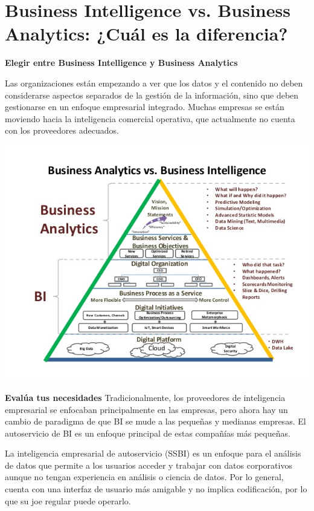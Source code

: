 \section{Business Intelligence vs. Business Analytics: ¿Cuál es la diferencia?} 
\textbf{Elegir entre Business Intelligence y Business Analytics}
\vspace{5mm} %

Las organizaciones están empezando a ver que los datos y el contenido no deben considerarse aspectos separados de la gestión de la información, sino que deben gestionarse en un enfoque empresarial integrado. Muchas empresas se están moviendo hacia la inteligencia comercial operativa, que actualmente no cuenta con los proveedores adecuados.\\

\vspace{5mm} %
\begin{center}
\includegraphics[width=14cm]{./Imagenes/003}
\end{center}	
\vspace{12mm} %

\textbf{Evalúa tus necesidades} Tradicionalmente, los proveedores de inteligencia empresarial se enfocaban principalmente en las empresas, pero ahora hay un cambio de paradigma de que BI se mude a las pequeñas y medianas empresas. El autoservicio de BI es un enfoque principal de estas compañías más pequeñas.

La inteligencia empresarial de autoservicio (SSBI) es un enfoque para el análisis de datos que permite a los usuarios acceder y trabajar con datos corporativos aunque no tengan experiencia en análisis o ciencia de datos. Por lo general, cuenta con una interfaz de usuario más amigable y no implica codificación, por lo que su joe regular puede operarlo.\\


